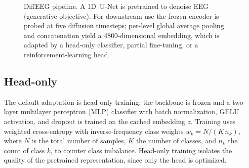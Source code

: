 \documentclass[journal]{IEEEtran}
\begin{document}
\begin{figure}[t]
\caption{DiffEEG pipeline. A 1D~U-Net is pretrained to denoise EEG (generative
objective). For downstream use the frozen encoder is probed at five diffusion
timesteps; per-level global average pooling and concatenation yield a
\num{4800}-dimensional embedding, which is adapted by a head-only classifier,
partial fine-tuning, or a reinforcement-learning head.}
\label{fig:arch}
\end{figure}

\subsection{Head-only}
\label{subsec:headonly}
The default adaptation is head-only training: the backbone is frozen and a
two-layer multilayer perceptron (MLP) classifier with batch normalization, GELU
activation, and dropout is trained on the cached embedding $z$. Training uses
weighted cross-entropy with inverse-frequency class weights
$w_k = N/(K\,n_k)$, where $N$ is the total number of samples, $K$ the number of
classes, and $n_k$ the count of class $k$, to counter class imbalance. Head-only
training isolates the quality of the pretrained representation, since only the
head is optimized.
\end{document}
